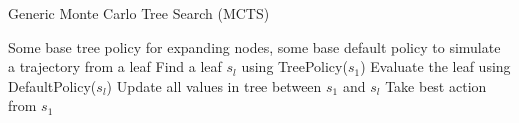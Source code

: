 \begin{algorithm}[t!]
\caption{Generic Monte Carlo Tree Search (MCTS)}
\begin{algorithmic}[1]
\label{alg:mcts}
\REQUIRE Some base tree policy for expanding nodes, some base default policy to simulate a trajectory from a leaf
    \STATE Find a leaf $s_l$ using TreePolicy($s_1$)
    \STATE Evaluate the leaf using DefaultPolicy($s_l$)
    \STATE Update all values in tree between $s_1$ and $s_l$
\ENDWHILE
\STATE Take best action from $s_1$
\end{algorithmic}
\end{algorithm}